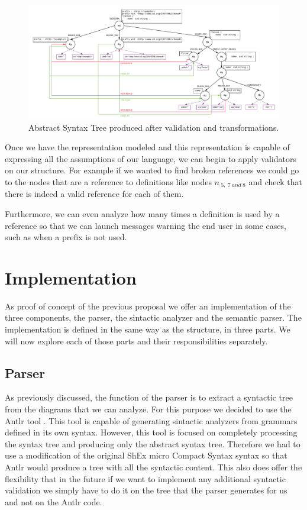 \begin{figure}
    \includegraphics[width=\textwidth]{images/shex-lite-sema-anal.pdf}
    \centering
    \caption[Abstract Syntax Tree produced after validation and transformations]{Abstract Syntax Tree produced after validation and
    transformations.}
    \label{fig:shex-lite-sema-anal}
\end{figure}

Once we have the representation modeled and this representation is capable of expressing all the assumptions of our language,
we can begin to apply validators on our structure. For example if we wanted to find broken references we could go to the nodes
that are a reference to definitions like nodes $n_{\:5,\:7\:and\:8}$ and check that there is indeed a valid reference for each of them.

Furthermore, we can even analyze how many times a definition is used by a reference so that we can launch messages warning the end user
in some cases, such as when a prefix is not used.

\section{Implementation}
As proof of concept of the previous proposal we offer an implementation of the three components, the parser, the sintactic analyzer
and the semantic parser. The implementation is defined in the same way as the structure, in three parts. We will now explore each
of those parts and their responsibilities separately.

\subsection{Parser}
As previously discussed, the function of the parser is to extract a syntactic tree from the diagrams that we can analyze.
For this purpose we decided to use the Antlr tool \cite{parr1995antlr}. This tool is capable of generating sintactic analyzers
from grammars defined in its own syntax. However, this tool is focused on completely processing the syntax tree and producing
only the abstract syntax tree. Therefore we had to use a modification of the original ShEx micro Compact Syntax syntax so that
Antlr would produce a tree with all the syntactic content. This also does offer the flexibility that in the future if we want to
implement any additional syntactic validation we simply have to do it on the tree that the parser generates for
us and not on the Antlr code.

